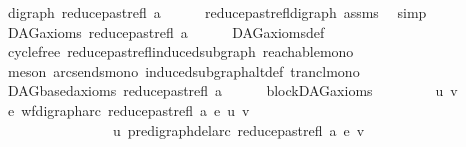 \begin{isabellebody}
\ {\isachardoublequoteopen}digraph\ {\isacharparenleft}{\kern0pt}reduce{\isacharunderscore}{\kern0pt}past{\isacharunderscore}{\kern0pt}refl\ a{\isacharparenright}{\kern0pt}{\isachardoublequoteclose}\isanewline
\ \ \ \ \isamarkupfalse%
\ reduce{\isacharunderscore}{\kern0pt}past{\isacharunderscore}{\kern0pt}refl{\isacharunderscore}{\kern0pt}digraph\ assms{\isacharparenleft}{\kern0pt}{}{\isacharparenright}{\kern0pt}\ \isamarkupfalse%
\ simp\isanewline
{}\isamarkupfalse%
\isanewline
\ \ \isamarkupfalse%
\ {\isachardoublequoteopen}DAG{\isacharunderscore}{\kern0pt}axioms\ {\isacharparenleft}{\kern0pt}reduce{\isacharunderscore}{\kern0pt}past{\isacharunderscore}{\kern0pt}refl\ a{\isacharparenright}{\kern0pt}{\isachardoublequoteclose}\isanewline
\ \ \ \ \isamarkupfalse%
\ DAG{\isacharunderscore}{\kern0pt}axioms{\isacharunderscore}{\kern0pt}def\isanewline
\ \ \ \ \isamarkupfalse%
\ cycle{\isacharunderscore}{\kern0pt}free\ reduce{\isacharunderscore}{\kern0pt}past{\isacharunderscore}{\kern0pt}refl{\isacharunderscore}{\kern0pt}induced{\isacharunderscore}{\kern0pt}subgraph\ reachable{\isacharunderscore}{\kern0pt}mono\isanewline
\ \ \ \ \isamarkupfalse%
\ {\isacharparenleft}{\kern0pt}meson\ arcs{\isacharunderscore}{\kern0pt}ends{\isacharunderscore}{\kern0pt}mono\ induced{\isacharunderscore}{\kern0pt}subgraph{\isacharunderscore}{\kern0pt}altdef\ trancl{\isacharunderscore}{\kern0pt}mono{\isacharparenright}{\kern0pt}\ \isanewline
{}\isamarkupfalse%
\isanewline
\ \ \isamarkupfalse%
\ {\isachardoublequoteopen}DAGbased{\isacharunderscore}{\kern0pt}axioms\ {\isacharparenleft}{\kern0pt}reduce{\isacharunderscore}{\kern0pt}past{\isacharunderscore}{\kern0pt}refl\ a{\isacharparenright}{\kern0pt}{\isachardoublequoteclose}\isanewline
\ \ \ \ \isamarkupfalse%
\ blockDAG{\isacharunderscore}{\kern0pt}axioms\isanewline
\ \ \isamarkupfalse%
\isanewline
\ \ \ \ \isamarkupfalse%
\ u\ v\ \isanewline
\ \ \ \ \isamarkupfalse%
\ {\isachardoublequoteopen}{\isasymforall}e{\isachardot}{\kern0pt}\ wf{\isacharunderscore}{\kern0pt}digraph{\isachardot}{\kern0pt}arc\ {\isacharparenleft}{\kern0pt}reduce{\isacharunderscore}{\kern0pt}past{\isacharunderscore}{\kern0pt}refl\ a{\isacharparenright}{\kern0pt}\ e\ {\isacharparenleft}{\kern0pt}u{\isacharcomma}{\kern0pt}\ v{\isacharparenright}{\kern0pt}\ {\isasymlongrightarrow}\isanewline
\ \ \ \ \ \ \ \ \ \ \ \ \ \ \ {\isasymnot}\ u\ {\isasymrightarrow}\isactrlsup {\isacharasterisk}{\kern0pt}\isactrlbsub pre{\isacharunderscore}{\kern0pt}digraph{\isachardot}{\kern0pt}del{\isacharunderscore}{\kern0pt}arc\ {\isacharparenleft}{\kern0pt}reduce{\isacharunderscore}{\kern0pt}past{\isacharunderscore}{\kern0pt}refl\ a{\isacharparenright}{\kern0pt}\ e\isactrlesub \ v{\isachardoublequoteclose}\isanewline

\end{isabellebody}
